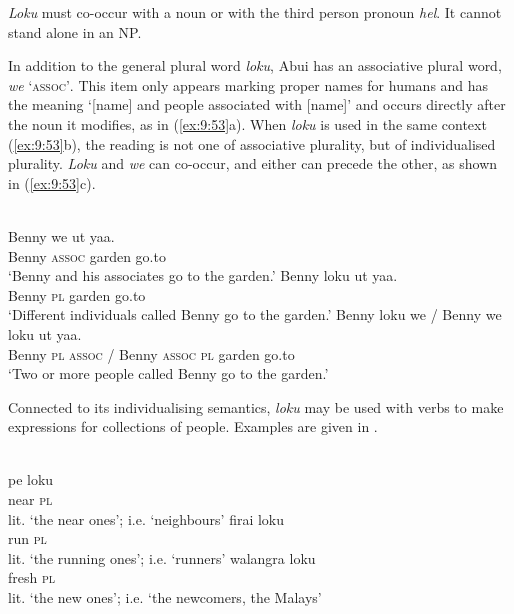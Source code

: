 \textit{Loku} must co-occur with a noun or with the third person pronoun \textit{hel}. It cannot stand alone in an NP.

In addition to the general plural word \textit{loku}, Abui has an associative plural word, \textit{we} `\textsc{assoc'}. This item only appears marking proper names for humans and has the meaning `[name] and people associated with [name]' and occurs directly after the noun it modifies, as in (\ref{ex:9:53}a). When \textit{loku} is used in the same context (\ref{ex:9:53}b), the reading is not one of associative plurality, but of individualised plurality. \textit{Loku} and \textit{we} can co-occur, and either can precede the other, as shown in (\ref{ex:9:53}c).




\ea%
\label{ex:9:53}
\ea
{} \\
\gll Benny w{e} ut yaa. \\
   Benny \textsc{assoc} garden go.to  \\
\glt `Benny and his associates go to the garden.'
\ex
\gll Benny loku ut yaa. \\
   Benny \textsc{pl} garden go.to  \\
\glt `Different individuals called Benny go to the garden.'
\ex
\gll Benny loku we / Benny  we loku ut yaa.\\
    Benny \textsc{pl}  \textsc{assoc} / Benny \textsc{assoc} \textsc{pl} garden go.to\\
\glt  `Two or more people called Benny go to the garden.'
\z
\z






Connected to its individualising semantics, \textit{loku} may be used with verbs to make expressions for collections of people. Examples are given in .


\ea%
\label{ex:9:54}
\ea
{} \\
\gll pe loku  \\
   near \textsc{pl}  \\
\glt lit. `the near ones'; i.e. `neighbours'
\ex
\gll firai loku \\
  run \textsc{pl}   \\
 \glt lit. `the running ones'; i.e. `runners'
\glt
\ex
\gll walangra loku \\
   fresh \textsc{pl}  \\
\glt  lit. `the new ones'; i.e. `the newcomers, the Malays'
\z
\z






